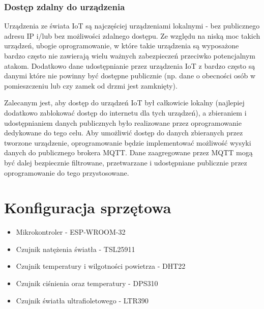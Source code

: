 \documentclass[12pt,a4paper]{article}
\begin{document}
\subsubsection{Dostęp zdalny do urządzenia}

Urządzenia ze świata IoT są najczęściej urządzeniami lokalnymi - bez publicznego adresu IP i/lub bez możliwości zdalnego dostępu. Ze względu na niską moc takich urządzeń, ubogie oprogramowanie, w które takie urządzenia są wyposażone bardzo często nie zawierają wielu ważnych zabezpieczeń przeciwko potencjalnym atakom. Dodatkowo dane udostępnianie przez urządzenia IoT z bardzo często są danymi które nie powinny być dostępne publicznie (np. dane o obecności osób w pomieszczeniu lub czy zamek od drzmi jest zamknięty).

Zalecanym jest, aby dostęp do urządzeń IoT był całkowicie lokalny (najlepiej dodatkowo zablokować dostęp do internetu dla tych urządzeń), a zbieraniem i udostępnianiem danych publicznych było realizowane przez oprogramowanie dedykowane do tego celu. Aby umożliwić dostęp do danych zbieranych przez tworzone urządzenie, oprogramowanie będzie implementować możliwość wysyki danych do publicznego brokera MQTT. Dane zaagregowane przez MQTT mogą być dalej bezpiecznie filtrowane, przetwarzane i udostępniane publicznie przez oprogramowanie do tego przystosowane.

\section{Konfiguracja sprzętowa}

\begin{itemize}
    \item Mikrokontroler - ESP-WROOM-32
    \item Czujnik natężenia światła - TSL25911
    \item Czujnik temperatury i wilgotności powietrza - DHT22
    \item Czujnik ciśnienia oraz temperatury - DPS310
    \item Czujnik światła ultrafioletowego - LTR390
\end{itemize}
\end{document}

